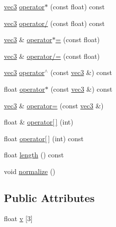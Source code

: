\begin{DoxyCompactItemize}
\item 
\hyperlink{structvec3}{vec3} \hyperlink{structvec3_a1ed5889d7f706e1dd8111546e19e5171}{operator$\ast$} (const float) const 
\item 
\hyperlink{structvec3}{vec3} \hyperlink{structvec3_a3f506aaaea420b751e6928e2d080fa2d}{operator/} (const float) const 
\item 
\hyperlink{structvec3}{vec3} \& \hyperlink{structvec3_adb800577653efc53821cab5c47249207}{operator$\ast$=} (const float)
\item 
\hyperlink{structvec3}{vec3} \& \hyperlink{structvec3_ae5866f35cc874c4ea7e2920163ee709f}{operator/=} (const float)
\item 
\hyperlink{structvec3}{vec3} \hyperlink{structvec3_af10f17f6dcf4cb0b63827ac5d6afa168}{operator$^\wedge$} (const \hyperlink{structvec3}{vec3} \&) const 
\item 
float \hyperlink{structvec3_aa5a0eb462a38fe9ed5ec11d127f1fe2e}{operator$\ast$} (const \hyperlink{structvec3}{vec3} \&) const 
\item 
\hyperlink{structvec3}{vec3} \& \hyperlink{structvec3_ae173f2c6d7b48905e0f2666ae8d2c575}{operator=} (const \hyperlink{structvec3}{vec3} \&)
\item 
float \& \hyperlink{structvec3_a844c40453b104e13968b06eec9b6a43e}{operator\mbox{[}$\,$\mbox{]}} (int)
\item 
float \hyperlink{structvec3_a7d8037216800e2c2ad7b72817f5057ea}{operator\mbox{[}$\,$\mbox{]}} (int) const 
\item 
float \hyperlink{structvec3_ad622150f0a08c548b062775dd5d76a41}{length} () const 
\item 
void \hyperlink{structvec3_ae3cc67c1a7a21bd1aa051a30943332c5}{normalize} ()
\end{DoxyCompactItemize}
\subsection*{Public Attributes}
\begin{DoxyCompactItemize}
\item 
float \hyperlink{structvec3_ad09608040a1a4e4d026086eff69725d2}{v} \mbox{[}3\mbox{]}
\end{DoxyCompactItemize}


